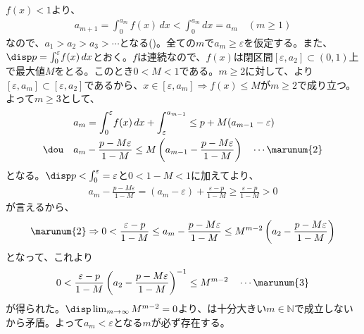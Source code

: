 $f(x)<1$より、
\begin{align*}
 a_{m+1}=\int^{a_m}_0\! f(x) \,dx < \int^{a_m}_0 dx = a_m \quad (m\ge 1)
\end{align*}
なので、$a_1>a_2>a_3>\cdots$となる()。全ての$m$で$a_m\ge\varepsilon$を仮定する。また、$\disp p=\int_0^\varepsilon\! f(x) \,dx$とおく。$f$は連続なので、$f(x)$は閉区間$[\varepsilon, a_2]\subset (0, 1)$上で最大値$M$をとる。このとき$0<M<1$である。$m\ge 2$に対して、より$[\varepsilon, a_m]\subset [\varepsilon, a_2]$であるから、$x\in[\varepsilon, a_m] \Rightarrow f(x)\le M$が$m\ge 2$で成り立つ。よって$m\ge 3$として、
\begin{align*}
 &a_m=\int^\varepsilon_0\! f(x) \,dx + \int^{a_{m-1}}_\varepsilon\le p+M(a_{m-1}-\varepsilon) \\
 \dou \quad& a_m-\frac{p-M\varepsilon}{1-M}\le M\left(a_{m-1}-\frac{p-M\varepsilon}{1-M}\right) \quad \cdots \marunum{2}
\end{align*}
となる。$\disp p<\int^\varepsilon_0=\varepsilon$と$0<1-M<1$に加えてより、
\begin{align*}
 a_m-\frac{p-M\varepsilon}{1-M}=(a_m-\varepsilon)+\frac{\varepsilon-p}{1-M}\ge\frac{\varepsilon-p}{1-M}>0
\end{align*}
が言えるから、
\begin{align*}
 \marunum{2}\Rightarrow 0<\frac{\varepsilon-p}{1-M}\le a_m-\frac{p-M\varepsilon}{1-M}\le M^{m-2}\left(a_2-\frac{p-M\varepsilon}{1-M}\right)
\end{align*}
となって、これより
\begin{align*}
 0<\frac{\varepsilon-p}{1-M}\left(a_2-\frac{p-M\varepsilon}{1-M}\right)^{-1}\le M^{m-2} \quad \cdots \marunum{3}
\end{align*}
が得られた。$\disp \lim_{m\to\infty}M^{m-2}=0$より、は十分大きい$m\in\mathbb{N}$で成立しないから矛盾。よって$a_m<\varepsilon$となる$m$が必ず存在する。